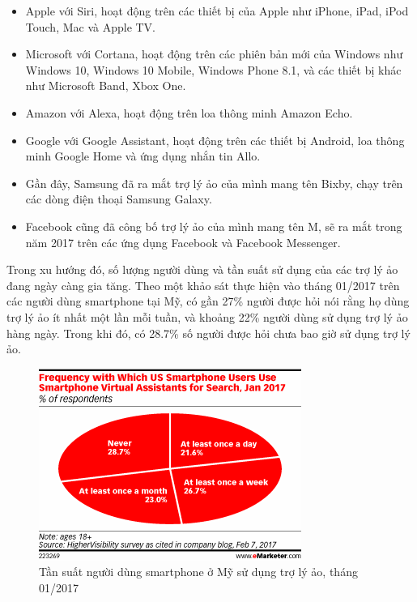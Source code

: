 \begin{itemize}
    \item Apple với Siri, hoạt động trên các thiết bị của Apple như iPhone, iPad, iPod Touch, Mac và Apple TV.
    \item Microsoft với Cortana, hoạt động trên các phiên bản mới của Windows như Windows 10, Windows 10 Mobile, Windows Phone 8.1, và các thiết bị khác như Microsoft Band, Xbox One.
    \item Amazon với Alexa, hoạt động trên loa thông minh Amazon Echo.
    \item Google với Google Assistant, hoạt động trên các thiết bị Android, loa thông minh Google Home và ứng dụng nhắn tin Allo.
    \item Gần đây, Samsung đã ra mắt trợ lý ảo của mình mang tên Bixby, chạy trên các dòng điện thoại Samsung Galaxy.
    \item Facebook cũng đã công bố trợ lý ảo của mình mang tên M, sẽ ra mắt trong năm 2017 trên các ứng dụng Facebook và Facebook Messenger.
\end{itemize}

Trong xu hướng đó, số lượng người dùng và tần suất sử dụng của các trợ lý ảo đang ngày càng gia tăng. Theo một khảo sát thực hiện vào tháng 01/2017 trên các người dùng smartphone tại Mỹ\cite{emarketerreport}, có gần 27\% người được hỏi nói rằng họ dùng trợ lý ảo ít nhất một lần mỗi tuần, và khoảng 22\% người dùng sử dụng trợ lý ảo hàng ngày. Trong khi đó, có 28.7\% số người được hỏi chưa bao giờ sử dụng trợ lý ảo.

\begin{figure}[h]
    \centering
    \includegraphics[scale=1]{emarketer_1}
    \caption[Tần suất người dùng smartphone ở Mỹ sử dụng trợ lý ảo]{Tần suất người dùng smartphone ở Mỹ sử dụng trợ lý ảo, tháng 01/2017\cite{emarketerreport}}
    \label{fig:c1_emarketer_1}
\end{figure}


